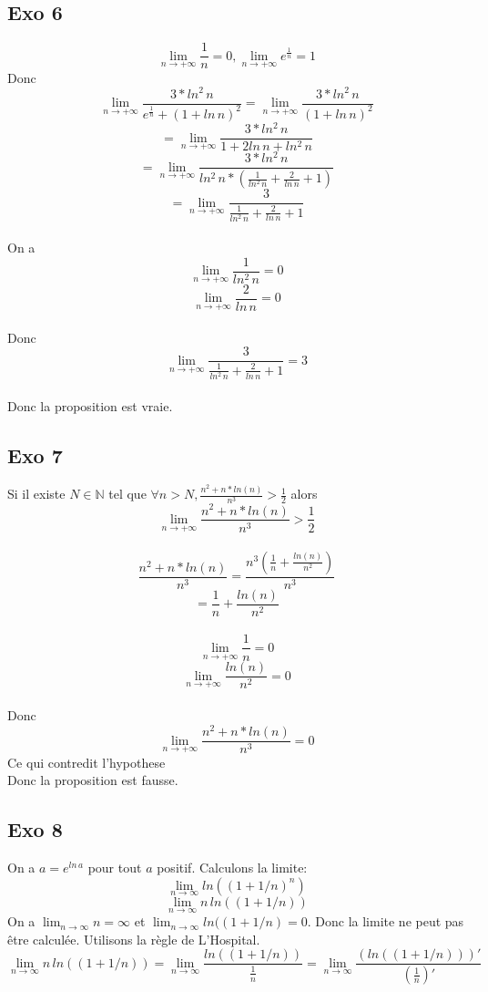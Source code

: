 \documentclass[]{book}
\theoremstyle{definition}
\begin{document}
\subsection*{Exo 6}
$$\lim_{n \to + \infty} \frac{1}{n} = 0, \lim_{n \to + \infty} e^{\frac{1}{n}} = 1$$
Donc
$$\lim_{n \to + \infty} \frac{3*ln^2 \, n}{e^{\frac{1}{n}}+(1+ln \, n)^2} = \lim_{n \to + \infty} \frac{3*ln^2 \, n}{(1+ln \, n)^2}$$
$$=\lim_{n \to + \infty} \frac{3*ln^2 \, n}{1+2ln \, n+ln^2 \, n}$$
$$=\lim_{n \to + \infty} \frac{3*ln^2 \, n}{ln^2 \, n *(\frac {1}{ln^2 \, n}+\frac {2}{ln \, n} +1)}$$
$$=\lim_{n \to + \infty} \frac{3}{\frac {1}{ln^2 \, n}+\frac {2}{ln \, n} +1}$$
\\
On a 
$$\lim_{n \to + \infty} \frac {1}{ln^2 \, n} = 0$$
$$\lim_{n \to + \infty} \frac {2}{ln \, n} = 0$$
\\
Donc
$$\lim_{n \to + \infty} \frac{3}{\frac {1}{ln^2 \, n}+\frac {2}{ln \, n} +1} = 3$$
\\ 
Donc la proposition est vraie.


\subsection*{Exo 7}
Si il existe $N \in \mathbb{N}$ tel que $\forall n > N, \frac{n^2+n*ln(n)}{n^3} > \frac{1}{2}$ alors 
$$ \lim_{n \to + \infty} \frac{n^2+n*ln(n)}{n^3} > \frac{1}{2} $$
\\
$$ \frac{n^2+n*ln(n)}{n^3} = \frac{n^3(\frac{1}{n}+\frac {ln(n)}{n^2})}{n^3}$$
$$= \frac{1}{n}+\frac {ln(n)}{n^2}$$
\\
$$ \lim_{n \to + \infty} \frac{1}{n} = 0 $$
$$ \lim_{n \to + \infty} \frac {ln(n)}{n^2} = 0$$
\\
Donc
$$ \lim_{n \to + \infty} \frac{n^2+n*ln(n)}{n^3} = 0$$
Ce qui contredit l'hypothese
\\ 
Donc la proposition est fausse.



\subsection*{Exo 8}
On a $a = e^{ln\, a}$ pour tout $a$ positif.
Calculons la limite: $$\lim_{n \to \infty} ln((1+1/n)^n)$$
$$\lim_{n \to \infty} n\, ln((1+1/n))$$
On a $\lim_{n \to \infty} n = \infty$ et $\lim_{n \to \infty} ln((1+1/n) = 0$. 
Donc la limite ne peut pas \^etre calcul\'ee.
Utilisons la r\`egle de L'Hospital.
$$\lim_{n \to \infty} n\, ln((1+1/n)) = \lim_{n \to \infty} \frac{ln((1+1/n))}{\frac{1}{n}}
 = \lim_{n \to \infty} \frac{(ln((1+1/n)))'}{(\frac{1}{n})'}$$
\end{document}
